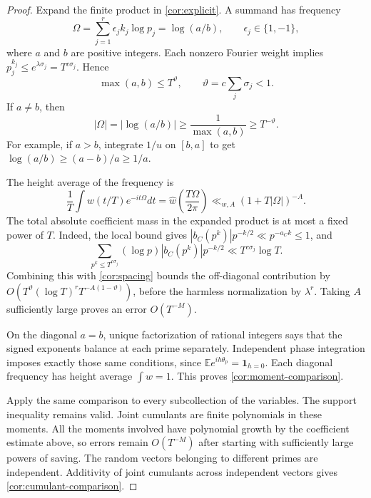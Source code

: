 \documentclass[11pt,reqno]{amsart}
\numberwithin{equation}{section}
\theoremstyle{definition}
\theoremstyle{remark}
\begin{document}
\begin{proof}
Expand the finite product in \eqref{cor:explicit}. A summand has frequency
\begin{equation}\Omega=\sum_{j=1}^r\epsilon_jk_j\log p_j=\log(a/b),\qquad \epsilon_j\in\{1,-1\},\label{cor:frequency}\end{equation}
where $a$ and $b$ are positive integers. Each nonzero Fourier weight implies
$p_j^{k_j}\le e^{\lambda\sigma_j}=T^{c\sigma_j}$. Hence
\begin{equation}\max(a,b)\le T^\vartheta,\qquad \vartheta=c\sum_j\sigma_j<1.\label{cor:ab-bound}\end{equation}
If $a\ne b$, then
\begin{equation}|\Omega|=|\log(a/b)|\ge\frac1{\max(a,b)}\ge T^{-\vartheta}.\label{cor:spacing}\end{equation}
For example, if $a>b$, integrate $1/u$ on $[b,a]$ to get $\log(a/b)\ge(a-b)/a\ge1/a$.

The height average of the frequency is
\begin{equation}\frac1T\int w(t/T)e^{-it\Omega}dt
=\widehat w\left(\frac{T\Omega}{2\pi}\right)
\ll_{w,A}(1+T|\Omega|)^{-A}.\label{cor:window-decay}\end{equation}
The total absolute coefficient mass in the expanded product is at most a fixed power of $T$. Indeed, the local bound gives $|b_C(p^k)|p^{-k/2}\ll p^{-a_Ck}\le1$, and
\[
\sum_{p^k\le T^{c\sigma_j}}(\log p)|b_C(p^k)|p^{-k/2}
\ll T^{c\sigma_j}\log T.
\]
Combining this with \eqref{cor:spacing} bounds the off-diagonal contribution by
$O(T^\vartheta(\log T)^rT^{-A(1-\vartheta)})$, before the harmless normalization by $\lambda^r$. Taking $A$ sufficiently large proves an error $O(T^{-M})$.

On the diagonal $a=b$, unique factorization of rational integers says that the signed exponents balance at each prime separately. Independent phase integration imposes exactly those same conditions, since
$\mathbb E e^{ih\theta_p}=\mathbf1_{h=0}$. Each diagonal frequency has height average $\int w=1$. This proves \eqref{cor:moment-comparison}.

Apply the same comparison to every subcollection of the variables. The support inequality remains valid. Joint cumulants are finite polynomials in these moments. All the moments involved have polynomial growth by the coefficient estimate above, so errors remain $O(T^{-M})$ after starting with sufficiently large powers of saving. The random vectors belonging to different primes are independent. Additivity of joint cumulants across independent vectors gives \eqref{cor:cumulant-comparison}.
\end{proof}
\end{document}
